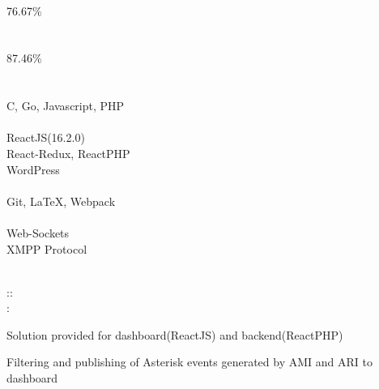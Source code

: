 \documentclass[]{hemant-style}
\begin{document}
\begin{minipage}[]{\textwidth}
\begin{minipage}{\textwidth}
\begin{minipage}[t][][c]{.25\textwidth}
                            \\
                            76.67\%\\
                            \newline
                            \\
                            \\
                            87.46\%\\
                            \newline
                             \\
                            \\
                            C, Go, Javascript, PHP\\
                            \\
                            ReactJS(16.2.0) \\React-Redux, ReactPHP\\
                            WordPress\\
                            \\
                            Git, \LaTeX, Webpack\\
                            \\
                            Web-Sockets \\XMPP Protocol\\
                            \vspace{1em}
                        \end{minipage}
                        \begin{minipage}[t][][c]{.75\textwidth}
                             \\
                            ::\\
                            :
                            \begin{hitemize}
                                \item Solution provided for dashboard(ReactJS) and backend(ReactPHP)
                                \item Filtering and publishing of Asterisk events generated by AMI and ARI to dashboard

\end{hitemize}
\end{minipage}
\end{minipage}
\end{minipage}
\end{document}
